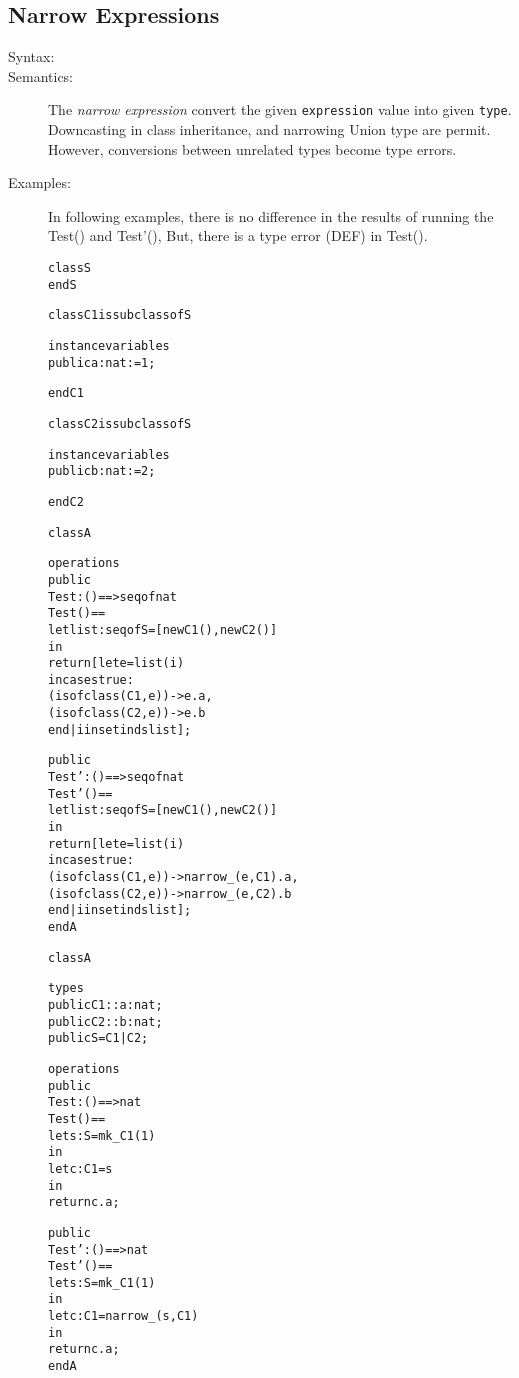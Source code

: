 \documentclass[\pformat,12pt]{article}
\begin{document}
\subsection{Narrow Expressions}

\begin{description}
\item[Syntax:]


    \item[Semantics:] The {\it narrow expression} convert the given {\tt expression} value into given {\tt type}.
	Downcasting in class inheritance, and narrowing Union type are permit.
	However, conversions between unrelated types become type errors.
    
    \item[Examples:] In following examples, there is no difference in the results of running the Test() and Test'(), 
	But, there is a type error (DEF) in Test().

      \begin{alltt}
class S
end S

class C1 is subclass of S

instance variables
public a : nat := 1;

end C1

class C2 is subclass of S

instance variables
public b : nat := 2;

end C2

class A

operations
public
Test: () ==>  seq of nat
Test() ==
 let list : seq of S = [ new C1(), new C2() ]
 in
   return [ let e = list(i)
            in cases true:
                (isofclass(C1, e)) -> e.a,
                (isofclass(C2, e)) -> e.b
               end | i in set inds list ];

public
Test': () ==>  seq of nat
Test'() ==
 let list : seq of S = [ new C1(), new C2() ]
 in
   return [ let e = list(i)
            in cases true:
                (isofclass(C1, e)) -> narrow_(e, C1).a,
                (isofclass(C2, e)) -> narrow_(e, C2).b
               end | i in set inds list ];
end A
      \end{alltt}
 
      \begin{alltt}
class A

types
public C1 :: a : nat;
public C2 :: b : nat;
public S = C1 | C2;

operations
public
Test: () ==> nat
Test() ==
 let s : S = mk_C1(1)
 in
   let c : C1 = s
   in
     return c.a;

public
Test': () ==> nat
Test'() ==
 let s : S = mk_C1(1)
 in
   let c : C1 = narrow_(s, C1)
   in
     return c.a;
end A
      \end{alltt}

\end{description}
\end{document}
